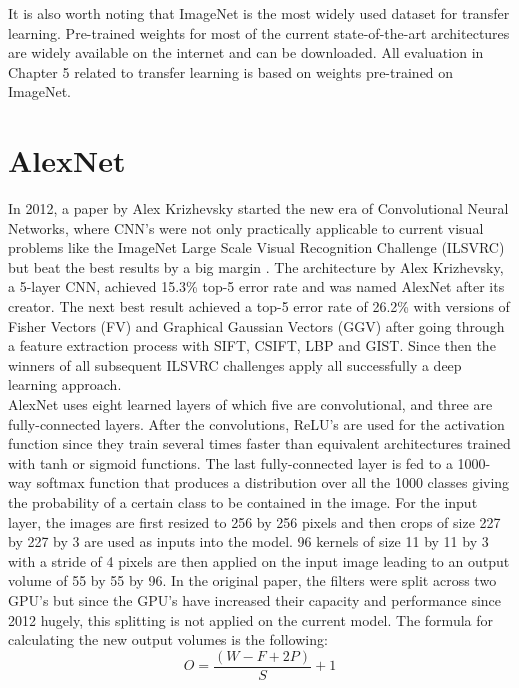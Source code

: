 It is also worth noting that ImageNet is the most widely used dataset for transfer learning. Pre-trained weights for most of the current state-of-the-art architectures are widely available on the internet and can be downloaded. All evaluation in Chapter 5 related to transfer learning is based on weights pre-trained on ImageNet.

\section{AlexNet}

In 2012, a paper by Alex Krizhevsky started the new era of Convolutional Neural Networks, where CNN's were not only practically applicable to current visual problems like the ImageNet Large Scale Visual Recognition Challenge (ILSVRC) but beat the best results by a big margin \cite{krizhevsky2012imagenet, imagenet}. The architecture by Alex Krizhevsky, a 5-layer CNN, achieved 15.3\% top-5 error rate and was named AlexNet after its creator. The next best result achieved a top-5 error rate of 26.2\% with versions of Fisher Vectors (FV) and Graphical Gaussian Vectors (GGV) after going through a feature extraction process with SIFT, CSIFT, LBP and GIST. Since then the winners of all subsequent ILSVRC challenges apply all successfully a deep learning approach. \\

AlexNet uses eight learned layers of which five are convolutional, and three are fully-connected layers. After the convolutions, ReLU's are used for the activation function since they train several times faster than equivalent architectures trained with tanh or sigmoid functions. The last fully-connected layer is fed to a 1000-way softmax function that produces a distribution over all the 1000 classes giving the probability of a certain class to be contained in the image. For the input layer, the images are first resized to 256 by 256 pixels and then crops of size 227 by 227 by 3 are used as inputs into the model. 96 kernels of size 11 by 11 by 3 with a stride of 4 pixels are then applied on the input image leading to an output volume of 55 by 55 by 96. In the original paper, the filters were split across two GPU's but since the GPU's have increased their capacity and performance since 2012 hugely, this splitting is not applied on the current model. The formula for calculating the new output volumes is the following: \\

\[ O = {\frac{(W - F + 2P)}{S}} + 1 \] \\

